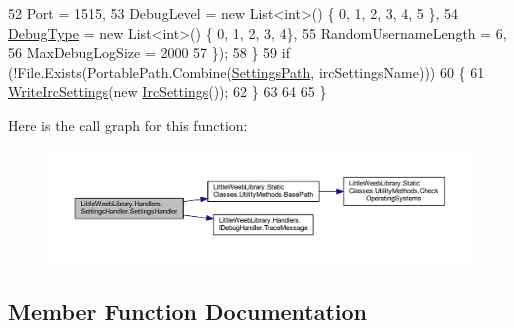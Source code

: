 \begin{DoxyCode}
52                     Port = 1515,
53                     DebugLevel = \textcolor{keyword}{new} List<int>() \{ 0, 1, 2, 3, 4, 5 \},
54                     \mbox{\hyperlink{namespace_little_weeb_library_1_1_handlers_ab66019ed40462876ec4e61bb3ccb0a62}{DebugType}} = \textcolor{keyword}{new} List<int>() \{ 0, 1, 2, 3, 4\},
55                     RandomUsernameLength = 6,
56                     MaxDebugLogSize = 2000
57                 \});
58             \}
59             \textcolor{keywordflow}{if} (!File.Exists(PortablePath.Combine(\mbox{\hyperlink{class_little_weeb_library_1_1_handlers_1_1_settings_handler_a2e309fc6b949f0bb7e7ace8c2017be7f}{SettingsPath}}, ircSettingsName)))
60             \{
61                 \mbox{\hyperlink{class_little_weeb_library_1_1_handlers_1_1_settings_handler_ad42462e9e851301c5f5b91663dc3fe24}{WriteIrcSettings}}(\textcolor{keyword}{new} \mbox{\hyperlink{class_little_weeb_library_1_1_settings_1_1_irc_settings}{IrcSettings}}());
62             \}
63 
64 
65         \}
\end{DoxyCode}
Here is the call graph for this function\+:\nopagebreak
\begin{figure}[H]
\begin{center}
\leavevmode
\includegraphics[width=350pt]{class_little_weeb_library_1_1_handlers_1_1_settings_handler_a6b11494ae34a6ff54b825941ef06cdb2_cgraph}
\end{center}
\end{figure}


\subsection{Member Function Documentation}
\mbox{\label{class_little_weeb_library_1_1_handlers_1_1_settings_handler_ad42462e9e851301c5f5b91663dc3fe24}} 
